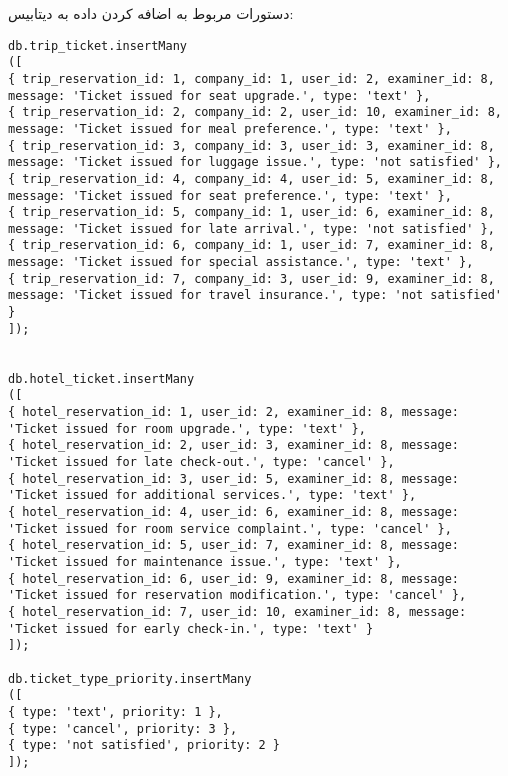 دستورات مربوط به اضافه کردن داده به دیتابیس:
\setLTR
\begin{lstlisting}
db.trip_ticket.insertMany
([
{ trip_reservation_id: 1, company_id: 1, user_id: 2, examiner_id: 8, message: 'Ticket issued for seat upgrade.', type: 'text' },
{ trip_reservation_id: 2, company_id: 2, user_id: 10, examiner_id: 8, message: 'Ticket issued for meal preference.', type: 'text' },
{ trip_reservation_id: 3, company_id: 3, user_id: 3, examiner_id: 8, message: 'Ticket issued for luggage issue.', type: 'not satisfied' },
{ trip_reservation_id: 4, company_id: 4, user_id: 5, examiner_id: 8, message: 'Ticket issued for seat preference.', type: 'text' },
{ trip_reservation_id: 5, company_id: 1, user_id: 6, examiner_id: 8, message: 'Ticket issued for late arrival.', type: 'not satisfied' },
{ trip_reservation_id: 6, company_id: 1, user_id: 7, examiner_id: 8, message: 'Ticket issued for special assistance.', type: 'text' },
{ trip_reservation_id: 7, company_id: 3, user_id: 9, examiner_id: 8, message: 'Ticket issued for travel insurance.', type: 'not satisfied' }
]);


db.hotel_ticket.insertMany
([
{ hotel_reservation_id: 1, user_id: 2, examiner_id: 8, message: 'Ticket issued for room upgrade.', type: 'text' },
{ hotel_reservation_id: 2, user_id: 3, examiner_id: 8, message: 'Ticket issued for late check-out.', type: 'cancel' },
{ hotel_reservation_id: 3, user_id: 5, examiner_id: 8, message: 'Ticket issued for additional services.', type: 'text' },
{ hotel_reservation_id: 4, user_id: 6, examiner_id: 8, message: 'Ticket issued for room service complaint.', type: 'cancel' },
{ hotel_reservation_id: 5, user_id: 7, examiner_id: 8, message: 'Ticket issued for maintenance issue.', type: 'text' },
{ hotel_reservation_id: 6, user_id: 9, examiner_id: 8, message: 'Ticket issued for reservation modification.', type: 'cancel' },
{ hotel_reservation_id: 7, user_id: 10, examiner_id: 8, message: 'Ticket issued for early check-in.', type: 'text' }
]);

db.ticket_type_priority.insertMany
([
{ type: 'text', priority: 1 },
{ type: 'cancel', priority: 3 },
{ type: 'not satisfied', priority: 2 }
]);


\end{lstlisting}
